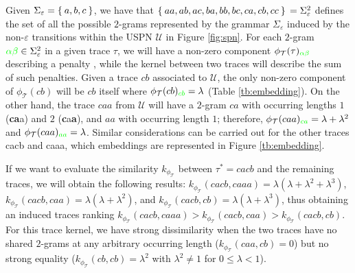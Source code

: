 \begin{example}
Given $\Sigma_\varepsilon=\Set{a,b,c}$, we have that $\Set{aa,ab,ac,ba,bb,bc,ca,cb,cc}\\=\Sigma^2_\varepsilon$ defines the set of all the possible $2$-grams represented by the grammar $\Sigma_\varepsilon$ induced by the non-$\varepsilon$ transitions within the USPN $\mathcal{U}$ in Figure \ref{fig:spn}. For each $2$-gram ${\color{green}\alpha\beta}\in\Sigma_\varepsilon^2$ in a given trace $\tau$, we will have a non-zero component $\phi_{\mathcal{T}}(\tau)_{\color{green}\alpha\beta}$ describing a penalty \cite{Gartner03}, while the kernel between two traces will describe the sum of such penalties. Given a trace $cb$ associated to $\mathcal{U}$,  the only non-zero component of $\phi_{\mathcal{T}}(cb)$ will be $cb$ itself where $\phi_{\mathcal{T}}(cb)_{\color{green}cb}=\lambda$ (Table \ref{tb:embedding}). On the other hand, the trace $caa$ from $\mathcal{U}$ will have a $2$-gram $ca$ with occurring lengths $1$ (\textbf{ca}a) and $2$ (\textbf{c}a\textbf{a}), and $aa$ with occurring length $1$; therefore, $\phi_{\mathcal{T}}(caa)_{\color{green}ca}=\lambda+\lambda^2$ and  $\phi_{\mathcal{T}}(caa)_{\color{green}aa}=\lambda$.  Similar considerations can be carried out for the other traces cacb and caaa, which embeddings are represented in Figure \ref{tb:embedding}. 

If we want to evaluate the similarity $k_{\phi_{\mathcal{T}}}$ between $\tau^*=cacb$ and the remaining traces, we will obtain the following results: $k_{\phi_{\mathcal{T}}}(cacb,caaa)=\lambda(\lambda+\lambda^2+\lambda^3)$,  $k_{\phi_{\mathcal{T}}}(cacb,caa)=\lambda(\lambda+\lambda^2)$, and $k_{\phi_{\mathcal{T}}}(cacb,cb)=\lambda(\lambda+\lambda^3)$, thus obtaining an induced traces ranking $k_{\phi_{\mathcal{T}}}(cacb,caaa)>k_{\phi_{\mathcal{T}}}(cacb,caa)>k_{\phi_{\mathcal{T}}}(cacb,cb)$. For this trace kernel, we have strong dissimilarity when the two traces have no shared $2$-grams at any arbitrary occurring length ($k_{\phi_{\mathcal{T}}}(caa,cb)=0$) but no strong equality ($k_{\phi_{\mathcal{T}}}(cb,cb)=\lambda^2$ with $\lambda^2\neq 1$ for $0\leq \lambda<1$).
\end{example}

